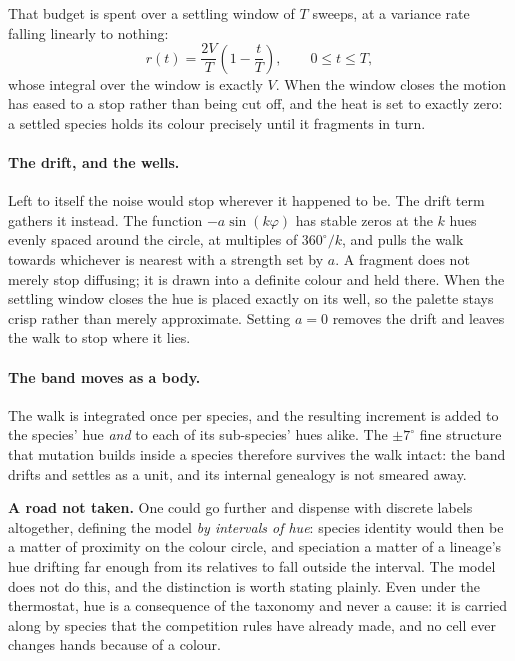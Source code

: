 \documentclass[11pt,a4paper]{article}
\begin{document}
That budget is spent over a settling window of $T$ sweeps, at a variance rate falling
linearly to nothing:
\begin{equation}
  r(t) = \frac{2V}{T}\left(1 - \frac{t}{T}\right), \qquad 0 \le t \le T,
\end{equation}
whose integral over the window is exactly $V$. When the window closes the motion has
eased to a stop rather than being cut off, and the heat is set to exactly zero: a settled
species holds its colour precisely until it fragments in turn.

\paragraph{The drift, and the wells.} Left to itself the noise would stop wherever it
happened to be. The drift term gathers it instead. The function $-a\sin(k\varphi)$ has
stable zeros at the $k$ hues evenly spaced around the circle, at multiples of
$360^{\circ}/k$, and pulls the walk towards whichever is nearest with a strength set by
$a$. A fragment does not merely stop diffusing; it is drawn into a definite colour and
held there. When the settling window closes the hue is placed exactly on its well, so the
palette stays crisp rather than merely approximate. Setting $a = 0$ removes the drift and
leaves the walk to stop where it lies.

\paragraph{The band moves as a body.} The walk is integrated once per species, and the
resulting increment is added to the species' hue \emph{and} to each of its sub-species'
hues alike. The $\pm 7^{\circ}$ fine structure that mutation builds inside a species
therefore survives the walk intact: the band drifts and settles as a unit, and its
internal genealogy is not smeared away.

\medskip
\noindent
\textbf{A road not taken.} One could go further and dispense with discrete labels
altogether, defining the model \emph{by intervals of hue}: species identity would then be a
matter of proximity on the colour circle, and speciation a matter of a lineage's hue
drifting far enough from its relatives to fall outside the interval. The model does not do
this, and the distinction is worth stating plainly. Even under the thermostat, hue is a
consequence of the taxonomy and never a cause: it is carried along by species that the
competition rules have already made, and no cell ever changes hands because of a
colour.
\end{document}
